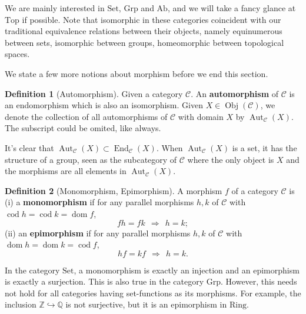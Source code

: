 \documentclass{article}
\theoremstyle{definition}
\newtheorem{definition}{Definition}[section]
\theoremstyle{definition}
\theoremstyle{remark}
\DeclareMathOperator{\Obj}{Obj}
\DeclareMathOperator{\dom}{dom}
\DeclareMathOperator{\cod}{cod}
\DeclareMathOperator{\End}{End}
\DeclareMathOperator{\Aut}{Aut}
\begin{document}
We are mainly interested in $\mathrm{Set}$, $\mathrm{Grp}$ and $\mathrm{Ab}$, and we will take a fancy glance at $\mathrm{Top}$ if possible. Note that isomorphic in these categories coincident with our traditional equivalence relations between their objects, namely equinumerous between sets, isomorphic between groups, homeomorphic between topological spaces.\par
We state a few more notions about morphism before we end this section.
	\begin{definition}[Automorphism]
	Given a category $\mathcal{C}$. An \textbf{automorphism} of $\mathcal{C}$ is an endomorphism which is also an isomorphism. Given $X\in\Obj(\mathcal{C})$, we denote the collection of all automorphisms of $\mathcal{C}$ with domain $X$ by $\Aut_\mathcal{C}(X)$. The subscript could be omited, like always.
	\end{definition}
It's clear that $\Aut_\mathcal{C}(X)\subset \End_\mathcal{C}(X)$. When $\Aut_\mathcal{C}(X)$ is a set, it has the structure of a group, seen as the subcategory of $\mathcal{C}$ where the only object is $X$ and the morphisms are all elements in $\Aut_\mathcal{C}(X)$.
	\begin{definition}[Monomorphism, Epimorphism]
	A morphism $f$ of a category $\mathcal{C}$ is \\
	(i) a \textbf{monomorphism} if for any parallel morphisms $h,k$ of $\mathcal{C}$ with $\cod h=\cod k=\dom f$,
	\[fh=fk\ \ \Rightarrow\ \ h=k;\]
	(ii) an \textbf{epimorphism} if for any parallel morphisms $h,k$ of $\mathcal{C}$ with $\dom h=\dom k=\cod f$, 
	\[hf=kf\ \ \Rightarrow\ \ h=k.\]
	\end{definition}
In the category $\mathrm{Set}$, a monomorphism is exactly an injection and an epimorphism is exactly a surjection. This is also true in the category $\mathrm{Grp}$. However, this needs not hold for all categories having set-functions as its morphisms. For example, the inclusion $\mathbb{Z}\hookrightarrow \mathbb{Q}$ is not surjective, but it is an epimorphism in $\mathrm{Ring}$.
\newpage
\end{document}
